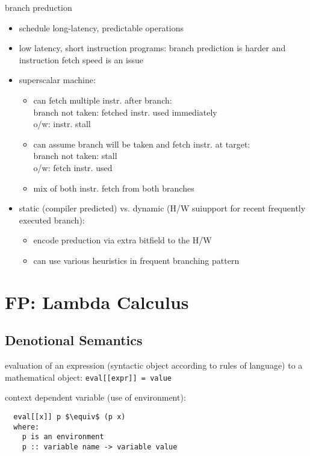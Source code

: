 \documentclass[8pt]{extarticle}
\begin{document}
\begin{multicols*}{2}
  branch preduction
  \begin{itemize}
  \item schedule long-latency, predictable operations
  \item low latency, short instruction programs: branch prediction is harder and instruction fetch speed is an issue
  \item superscalar machine:
    \begin{itemize}
    \item can fetch multiple instr. after branch:\\
      branch not taken: fetched instr. used immediately\\
      o/w: instr. stall
    \item can assume branch will be taken and fetch instr. at target:\\
      branch not taken: stall\\
      o/w: fetch instr. used
    \item mix of both instr. fetch from both branches
    \end{itemize}
  \item static (compiler predicted) vs. dynamic (H/W suiupport for recent frequently executed branch):
    \begin{itemize}
    \item encode preduction via extra bitfield to the H/W
    \item can use various heuristics in frequent branching pattern
    \end{itemize}
  \end{itemize}
    
  \vfill\null
  \columnbreak

  \section{FP: Lambda Calculus \cite{peyton1987}}

  \subsection{Denotional Semantics}
  
  evaluation of an expression (syntactic object according to rules of language) to a mathematical object: \verb|eval[[expr]] = value|

  context dependent variable (use of environment):
\begin{lstlisting}
  eval[[x]] p $\equiv$ (p x)
  where:
    p is an environment
    p :: variable name -> variable value


\end{lstlisting}
\end{multicols*}
\end{document}
